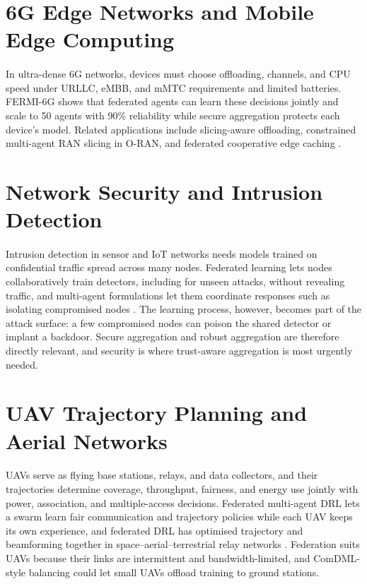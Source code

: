 \documentclass[12pt,a4paper,final]{extreport}
\begin{document}
\section{6G Edge Networks and Mobile Edge Computing}

\paragraph{} In ultra-dense 6G networks, devices must choose offloading, channels, and CPU speed under URLLC, eMBB, and mMTC requirements and limited batteries. FERMI-6G \cite{p2} shows that federated agents can learn these decisions jointly and scale to 50 agents with 90\% reliability while secure aggregation protects each device's model. Related applications include slicing-aware offloading, constrained multi-agent RAN slicing in O-RAN, and federated cooperative edge caching \cite{p3}.

\section{Network Security and Intrusion Detection}

\paragraph{} Intrusion detection in sensor and IoT networks needs models trained on confidential traffic spread across many nodes. Federated learning lets nodes collaboratively train detectors, including for unseen attacks, without revealing traffic, and multi-agent formulations let them coordinate responses such as isolating compromised nodes \cite{p3}. The learning process, however, becomes part of the attack surface: a few compromised nodes can poison the shared detector or implant a backdoor. Secure aggregation \cite{p2} and robust aggregation \cite{p3} are therefore directly relevant, and security is where trust-aware aggregation is most urgently needed.

\section{UAV Trajectory Planning and Aerial Networks}

\paragraph{} UAVs serve as flying base stations, relays, and data collectors, and their trajectories determine coverage, throughput, fairness, and energy use jointly with power, association, and multiple-access decisions. Federated multi-agent DRL lets a swarm learn fair communication and trajectory policies while each UAV keeps its own experience, and federated DRL has optimised trajectory and beamforming together in space--aerial--terrestrial relay networks \cite{p3}. Federation suits UAVs because their links are intermittent and bandwidth-limited, and ComDML-style balancing \cite{p4} could let small UAVs offload training to ground stations.
\end{document}
